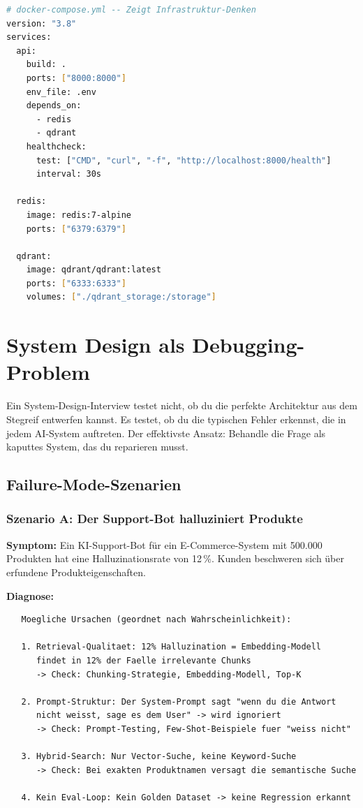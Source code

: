 \begin{lstlisting}[language=bash, caption=Minimale Deployment-Konfiguration im Portfolio]
# docker-compose.yml -- Zeigt Infrastruktur-Denken
version: "3.8"
services:
  api:
    build: .
    ports: ["8000:8000"]
    env_file: .env
    depends_on:
      - redis
      - qdrant
    healthcheck:
      test: ["CMD", "curl", "-f", "http://localhost:8000/health"]
      interval: 30s

  redis:
    image: redis:7-alpine
    ports: ["6379:6379"]

  qdrant:
    image: qdrant/qdrant:latest
    ports: ["6333:6333"]
    volumes: ["./qdrant_storage:/storage"]
\end{lstlisting}

\section{System Design als Debugging-Problem}

Ein System-Design-Interview testet nicht, ob du die perfekte Architektur aus dem Stegreif entwerfen kannst. Es testet, ob du die typischen Fehler erkennst, die in jedem AI-System auftreten. Der effektivste Ansatz: Behandle die Frage als kaputtes System, das du reparieren musst.

\subsection{Failure-Mode-Szenarien}

\subsubsection{Szenario A: Der Support-Bot halluziniert Produkte}

\textbf{Symptom:} Ein KI-Support-Bot für ein E-Commerce-System mit 500.000 Produkten hat eine Halluzinationsrate von 12\,\%. Kunden beschweren sich über erfundene Produkteigenschaften.

\textbf{Diagnose:}

\begin{verbatim}
   Moegliche Ursachen (geordnet nach Wahrscheinlichkeit):

   1. Retrieval-Qualitaet: 12% Halluzination = Embedding-Modell
      findet in 12% der Faelle irrelevante Chunks
      -> Check: Chunking-Strategie, Embedding-Modell, Top-K

   2. Prompt-Struktur: Der System-Prompt sagt "wenn du die Antwort
      nicht weisst, sage es dem User" -> wird ignoriert
      -> Check: Prompt-Testing, Few-Shot-Beispiele fuer "weiss nicht"

   3. Hybrid-Search: Nur Vector-Suche, keine Keyword-Suche
      -> Check: Bei exakten Produktnamen versagt die semantische Suche

   4. Kein Eval-Loop: Kein Golden Dataset -> keine Regression erkannt
\end{verbatim}

